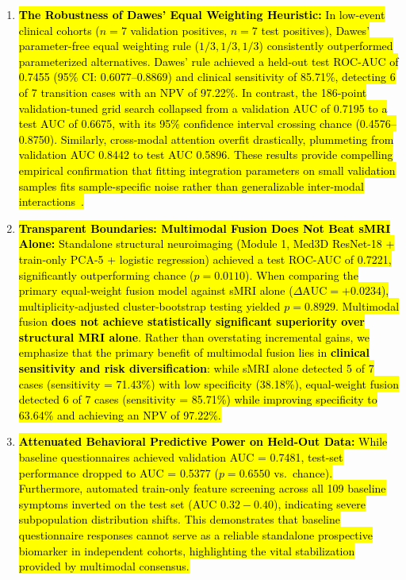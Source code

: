 \documentclass[10pt,letterpaper]{article}
\begin{document}
\begin{enumerate}
    \item \hl{\textbf{The Robustness of Dawes' Equal Weighting Heuristic:} In low-event clinical cohorts ($n=7$ validation positives, $n=7$ test positives), Dawes' parameter-free equal weighting rule ($1/3, 1/3, 1/3$) consistently outperformed parameterized alternatives. Dawes' rule achieved a held-out test ROC-AUC of 0.7455 (95\% CI: 0.6077--0.8869) and clinical sensitivity of 85.71\%, detecting 6 of 7 transition cases with an NPV of 97.22\%. In contrast, the 186-point validation-tuned grid search collapsed from a validation AUC of 0.7195 to a test AUC of 0.6675, with its 95\% confidence interval crossing chance (0.4576--0.8750). Similarly, cross-modal attention overfit drastically, plummeting from validation AUC 0.8442 to test AUC 0.5896. These results provide compelling empirical confirmation that fitting integration parameters on small validation samples fits sample-specific noise rather than generalizable inter-modal interactions~\cite{ref_dawes}.}
    \item \hl{\textbf{Transparent Boundaries: Multimodal Fusion Does Not Beat sMRI Alone:} Standalone structural neuroimaging (Module 1, Med3D ResNet-18 + train-only PCA-5 + logistic regression) achieved a test ROC-AUC of 0.7221, significantly outperforming chance ($p = 0.0110$). When comparing the primary equal-weight fusion model against sMRI alone ($\Delta\text{AUC} = +0.0234$), multiplicity-adjusted cluster-bootstrap testing yielded $p = 0.8929$. Multimodal fusion \textbf{does not achieve statistically significant superiority over structural MRI alone}. Rather than overstating incremental gains, we emphasize that the primary benefit of multimodal fusion lies in \textbf{clinical sensitivity and risk diversification}: while sMRI alone detected 5 of 7 cases (sensitivity = 71.43\%) with low specificity (38.18\%), equal-weight fusion detected 6 of 7 cases (sensitivity = 85.71\%) while improving specificity to 63.64\% and achieving an NPV of 97.22\%.}
    \item \hl{\textbf{Attenuated Behavioral Predictive Power on Held-Out Data:} While baseline questionnaires achieved validation AUC = 0.7481, test-set performance dropped to AUC = 0.5377 ($p = 0.6550$ vs.\ chance). Furthermore, automated train-only feature screening across all 109 baseline symptoms inverted on the test set (AUC $0.32-0.40$), indicating severe subpopulation distribution shifts. This demonstrates that baseline questionnaire responses cannot serve as a reliable standalone prospective biomarker in independent cohorts, highlighting the vital stabilization provided by multimodal consensus.}

\end{enumerate}
\end{document}
